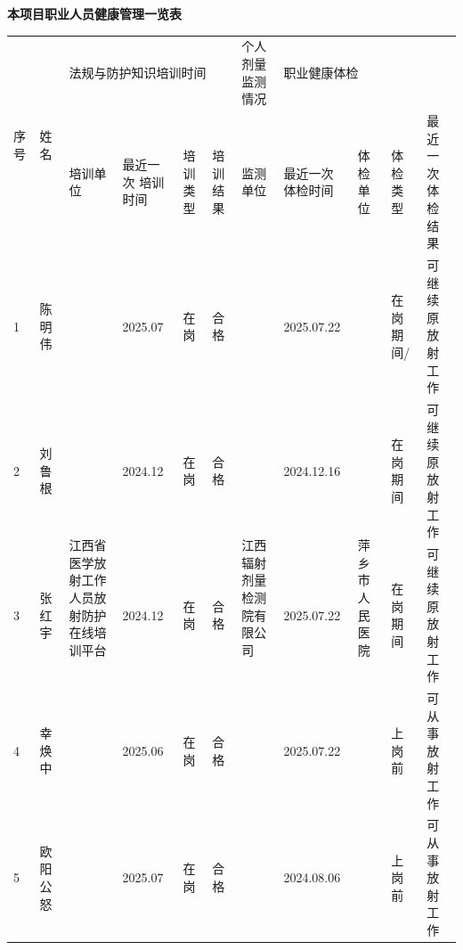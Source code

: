 \vspace{10mm}
\begin{center}
\songti
\setlength{\tabrestwidth}{\dimexpr\textwidth - 2.0cm - 20\tabcolsep - 12\arrayrulewidth\relax}
\textbf{本项目职业人员健康管理一览表}\par\vspace{2mm}
\begin{tabular}{|p{2.0cm}|p{\dimexpr\tabrestwidth/10\relax}|p{\dimexpr\tabrestwidth/10\relax}|p{\dimexpr\tabrestwidth/10\relax}|p{\dimexpr\tabrestwidth/10\relax}|p{\dimexpr\tabrestwidth/10\relax}|p{\dimexpr\tabrestwidth/10\relax}|p{\dimexpr\tabrestwidth/10\relax}|p{\dimexpr\tabrestwidth/10\relax}|p{\dimexpr\tabrestwidth/10\relax}|p{\dimexpr\tabrestwidth/10\relax}|}
\hline
\multirow{2}{*}{\raggedright 序号} & \multirow{2}{*}{\raggedright 姓名} & \multicolumn{4}{|p{\dimexpr \dimexpr\tabrestwidth/10\relax + \dimexpr\tabrestwidth/10\relax + \dimexpr\tabrestwidth/10\relax + \dimexpr\tabrestwidth/10\relax + 6\tabcolsep + 3\arrayrulewidth\relax}|}{\raggedright 法规与防护知识培训时间} & \raggedright 个人剂量监测情况 & \multicolumn{4}{|p{\dimexpr \dimexpr\tabrestwidth/10\relax + \dimexpr\tabrestwidth/10\relax + \dimexpr\tabrestwidth/10\relax + \dimexpr\tabrestwidth/10\relax + 6\tabcolsep + 3\arrayrulewidth\relax}|}{\raggedright 职业健康体检} \\
 &  & \raggedright 培训单位 & \raggedright 最近一次 培训时间 & \raggedright 培训类型 & \raggedright 培训结果 & \raggedright 监测单位 & \raggedright 最近一次体检时间 & \raggedright 体检单位 & \raggedright 体检类型 & \raggedright 最近一次 体检结果 \\
\hline
\raggedright 1 & \raggedright 陈明伟 & \multirow{5}{*}{\raggedright 江西省医学放射工作人员放射防护在线培训平台} & \raggedright 2025.07 & \raggedright 在岗 & \raggedright 合格 & \multirow{5}{*}{\raggedright 江西辐射剂量检测院有限公司} & \raggedright 2025.07.22 & \multirow{5}{*}{\raggedright 萍乡市人民医院} & \raggedright 在岗期间/ & \raggedright 可继续原放射工作 \\
\raggedright 2 & \raggedright 刘鲁根 &  & \raggedright 2024.12 & \raggedright 在岗 & \raggedright 合格 &  & \raggedright 2024.12.16 &  & \raggedright 在岗期间 & \raggedright 可继续原放射工作 \\
\raggedright 3 & \raggedright 张红宇 &  & \raggedright 2024.12 & \raggedright 在岗 & \raggedright 合格 &  & \raggedright 2025.07.22 &  & \raggedright 在岗期间 & \raggedright 可继续原放射工作 \\
\raggedright 4 & \raggedright 幸焕中 &  & \raggedright 2025.06 & \raggedright 在岗 & \raggedright 合格 &  & \raggedright 2025.07.22 &  & \raggedright 上岗前 & \raggedright 可从事放射工作 \\
\raggedright 5 & \raggedright 欧阳公怒 &  & \raggedright 2025.07 & \raggedright 在岗 & \raggedright 合格 &  & \raggedright 2024.08.06 &  & \raggedright 上岗前 & \raggedright 可从事放射工作 \\
\hline
\end{tabular}
\end{center}




